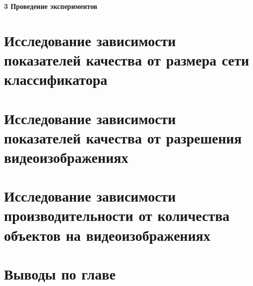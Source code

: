 \newpage
\begin{flushleft}
  \textbf{\large 3 Проведение экспериментов}
\end{flushleft}

\section{Исследование зависимости показателей качества от размера сети классификатора}

\section{Исследование зависимости показателей качества от разрешения видеоизображениях}

\section{Исследование зависимости производительности от количества объектов на видеоизображениях}

\section{Выводы по главе}
